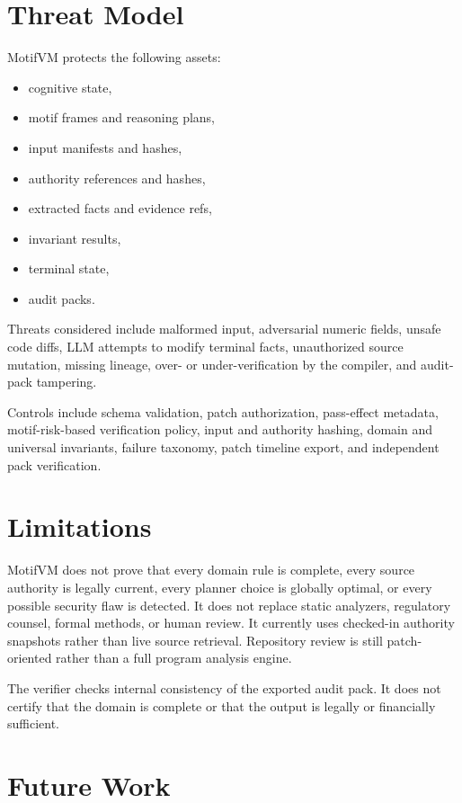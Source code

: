 \documentclass[11pt]{article}
\begin{document}
\section{Threat Model}

MotifVM protects the following assets:

\begin{itemize}[leftmargin=1.5em]
  \item cognitive state,
  \item motif frames and reasoning plans,
  \item input manifests and hashes,
  \item authority references and hashes,
  \item extracted facts and evidence refs,
  \item invariant results,
  \item terminal state,
  \item audit packs.
\end{itemize}

Threats considered include malformed input, adversarial numeric fields, unsafe code diffs, LLM attempts to modify terminal facts, unauthorized source mutation, missing lineage, over- or under-verification by the compiler, and audit-pack tampering.

Controls include schema validation, patch authorization, pass-effect metadata, motif-risk-based verification policy, input and authority hashing, domain and universal invariants, failure taxonomy, patch timeline export, and independent pack verification.

\section{Limitations}

MotifVM does not prove that every domain rule is complete, every source authority is legally current, every planner choice is globally optimal, or every possible security flaw is detected. It does not replace static analyzers, regulatory counsel, formal methods, or human review. It currently uses checked-in authority snapshots rather than live source retrieval. Repository review is still patch-oriented rather than a full program analysis engine.

The verifier checks internal consistency of the exported audit pack. It does not certify that the domain is complete or that the output is legally or financially sufficient.

\section{Future Work}
\end{document}
